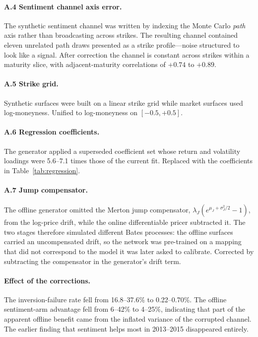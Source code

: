 \documentclass[11pt,a4paper]{article}
\begin{document}
\paragraph{A.4 Sentiment channel axis error.} The synthetic sentiment channel
was written by indexing the Monte Carlo \emph{path} axis rather than
broadcasting across strikes. The resulting channel contained eleven unrelated
path draws presented as a strike profile---noise structured to look like a
signal. After correction the channel is constant across strikes within a
maturity slice, with adjacent-maturity correlations of $+0.74$ to $+0.89$.

\paragraph{A.5 Strike grid.} Synthetic surfaces were built on a linear strike
grid while market surfaces used log-moneyness. Unified to log-moneyness on
$[-0.5, +0.5]$.

\paragraph{A.6 Regression coefficients.} The generator applied a superseded
coefficient set whose return and volatility loadings were 5.6--7.1 times those
of the current fit. Replaced with the coefficients in
Table~\ref{tab:regression}.

\paragraph{A.7 Jump compensator.} The offline generator omitted the Merton jump
compensator, $\lambda_J(e^{\mu_J + \sigma_J^2/2} - 1)$, from the log-price
drift, while the online differentiable pricer subtracted it. The two stages
therefore simulated different Bates processes: the offline surfaces carried an
uncompensated drift, so the network was pre-trained on a mapping that did not
correspond to the model it was later asked to calibrate. Corrected by
subtracting the compensator in the generator's drift term.

\paragraph{Effect of the corrections.} The inversion-failure rate fell from
16.8--37.6\% to 0.22--0.70\%. The offline sentiment-arm advantage fell from
6--42\% to 4--25\%, indicating that part of the apparent offline benefit came
from the inflated variance of the corrupted channel. The earlier finding that
sentiment helps most in 2013--2015 disappeared entirely.
\end{document}
